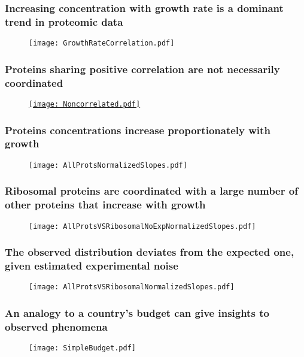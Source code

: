 \documentclass{beamer}
\begin{document}
\begin{frame}
\frametitle{Increasing concentration with growth rate is a dominant trend in proteomic data}
\begin{figure}[h!]
\centering
\texttt{[image: GrowthRateCorrelation.pdf]}
\end{figure}
\end{frame}

\begin{frame}
\frametitle{Proteins sharing positive correlation are not necessarily coordinated}
\begin{figure}[h!]
\centering
\href{https://plot.ly/~uri.barenholz/0/protein-concentration-vs-growth-rate/}
    {\texttt{[image: Noncorrelated.pdf]}}
\end{figure}

\end{frame}

\begin{frame}
\frametitle{Proteins concentrations increase proportionately with growth}
\begin{figure}[h!]
\centering
\texttt{[image: AllProtsNormalizedSlopes.pdf]}
\end{figure}
\end{frame}

\begin{frame}
\frametitle{Ribosomal proteins are coordinated with a large number of other proteins that increase with growth}
\begin{figure}[h!]
\centering
\texttt{[image: AllProtsVSRibosomalNoExpNormalizedSlopes.pdf]}
\end{figure}
\end{frame}

\begin{frame}
\frametitle{The observed distribution deviates from the expected one, given estimated experimental noise}
\begin{figure}[h!]
\centering
\texttt{[image: AllProtsVSRibosomalNormalizedSlopes.pdf]}
\end{figure}
\end{frame}

\begin{frame}
\frametitle{An analogy to a country's budget can give insights to observed phenomena}
\begin{figure}[h!]
\centering
\texttt{[image: SimpleBudget.pdf]}
\end{figure}
\end{frame}
\end{document}
